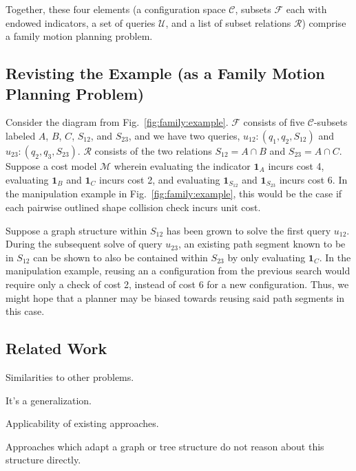 Together, these four elements
(a configuration space $\mathcal{C}$,
subsets $\mathcal{F}$ each with endowed indicators,
a set of queries $\mathcal{U}$,
and a list of subset relations $\mathcal{R}$)
comprise a family motion planning problem.

\subsection{Revisting the Example (as a Family Motion Planning Problem)}

Consider the diagram from Fig.~\ref{fig:family:example}.
$\mathcal{F}$ consists of five $\mathcal{C}$-subsets labeled
$A$, $B$, $C$, $S_{12}$, and $S_{23}$,
and we have two queries,
$u_{12}: (q_1, q_2, S_{12})$
and
$u_{23}: (q_2, q_3, S_{23})$.
$\mathcal{R}$ consists of the two relations
$S_{12} = A \cap B$ and $S_{23} = A \cap C$.
Suppose a cost model $\mathcal{M}$
wherein evaluating the indicator
$\mathbf{1}_A$ incurs cost 4,
evaluating $\mathbf{1}_B$ and $\mathbf{1}_C$ incurs cost 2,
and evaluating $\mathbf{1}_{S_{12}}$ and $\mathbf{1}_{S_{23}}$
incurs cost 6.
In the manipulation example in
Fig.~\ref{fig:family:example},
this would be the case if each
pairwise outlined shape collision check incurs unit cost.

Suppose a graph structure within ${S_{12}}$ has been grown to solve
the first query $u_{12}$.
During the subsequent solve of query $u_{23}$,
an existing path segment known to be in ${S_{12}}$ can be shown to
also be contained within ${S_{23}}$ by only evaluating $\mathbf{1}_C$.
In the manipulation example,
reusing an a configuration from the previous search
would require only a check of cost 2,
instead of cost 6 for a new configuration.
Thus, we might hope that a planner may be biased towards reusing
said path segments in this case.

\subsection{Related Work}

Similarities to other problems.

It's a generalization.

Applicability of existing approaches.

Approaches which adapt a graph or tree structure
\citep{ferguson2006drrt, gayle2007lazyreconfigforest}
do not reason about this structure directly.


